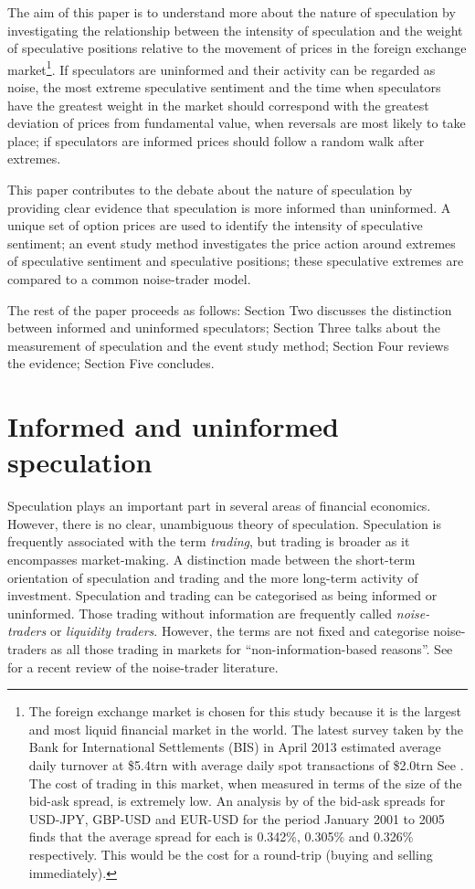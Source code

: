 \documentclass[preprint,12pt,authoryear]{elsarticle}
\begin{document}
The aim of this paper is to understand more about the nature of speculation by investigating the relationship between the intensity of speculation and the weight of speculative positions relative to the movement of prices in the foreign exchange market\footnote{\label{FX}The foreign exchange market is chosen for this study because it is the largest and most liquid financial market in the world.  The latest survey taken by the Bank for International Settlements (BIS) in April 2013 estimated average daily turnover at \$5.4trn with average daily spot transactions of \$2.0trn See \citet{BISFX2013}.  The cost of trading in this market, when measured in terms of the size of the bid-ask spread, is extremely low. An analysis by \citet{Steely2013} of the bid-ask spreads for USD-JPY, GBP-USD and EUR-USD for the period January 2001 to 2005 finds that the average spread for each is 0.342\%, 0.305\% and 0.326\% respectively.  This would be the cost for a round-trip (buying and selling immediately).}.  If speculators are uninformed and their activity can be regarded as noise, the most extreme speculative sentiment and the time when speculators have the greatest weight in the market should correspond with the greatest deviation of prices from fundamental value, when reversals are most likely to take place; if speculators are informed prices should follow a random walk after extremes.  

This paper contributes to the debate about the nature of speculation by providing clear evidence that speculation is more informed than uninformed. A unique set of option prices are used to identify the intensity of speculative sentiment; an event study method investigates the price action around extremes of speculative sentiment and speculative positions; these speculative extremes are compared to a common noise-trader model.  

The rest of the paper proceeds as follows:  Section Two discusses the distinction between informed and uninformed speculators; Section Three talks about the measurement of speculation and the event study method; Section Four reviews the evidence; Section Five concludes. 

\section{Informed and uninformed speculation}
Speculation plays an important part in several areas of financial economics.  However, there is no clear, unambiguous theory of speculation.  Speculation is frequently associated with the term \emph{trading}, but trading is broader as it encompasses market-making. A distinction made between the short-term orientation of speculation and trading and the more long-term activity of investment.   Speculation and trading can be categorised as being informed or uninformed. Those trading without information are frequently called \emph{noise-traders} or \emph{liquidity traders}.  However, the terms are not fixed and  \citet[p. 1]{GortonNoise} categorise noise-traders as all those trading in markets for ``non-information-based reasons''.  See \citet{Ramiah201589} for a recent review of the noise-trader literature. 
\end{document}
